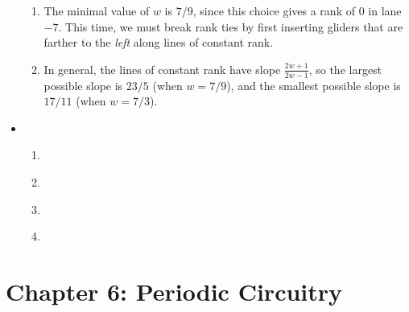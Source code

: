 \begin{multicols}{2}
\begin{itemize}[leftmargin=0em]
\begin{enumerate}[leftmargin=1.5em,label=\bf\color{ocre}(\alph*)]
			\item The minimal value of $w$ is $7/9$, since this choice gives a rank of $0$ in lane $-7$. This time, we must break rank ties by first inserting gliders that are farther to the \emph{left} along lines of constant rank.
			
			\item In general, the lines of constant rank have slope $\frac{2w+1}{2w-1}$, so the largest possible slope is $23/5$ (when $w = 7/9$), and the smallest possible slope is $17/11$ (when $w = 7/3$). \\
		\end{enumerate}
		
		
		\item[\bf\color{ocre}\sffamily\ref{exer:2_engine_corder_seed}]
		\begin{enumerate}[leftmargin=1.5em,label=\bf\color{ocre}(\alph*)]
			\item {} \\
			
			\item {} \\
			
			\item {} \\
			
			\item {} \\
		\end{enumerate}
	\end{itemize}
\end{multicols}




\hypertarget{solutions_periodic_circuitry}{}\label{solutions_periodic_circuitry}
\section*{Chapter 6: Periodic Circuitry}
\renewcommand{\chapterfolder}{periodic_circuitry/}


